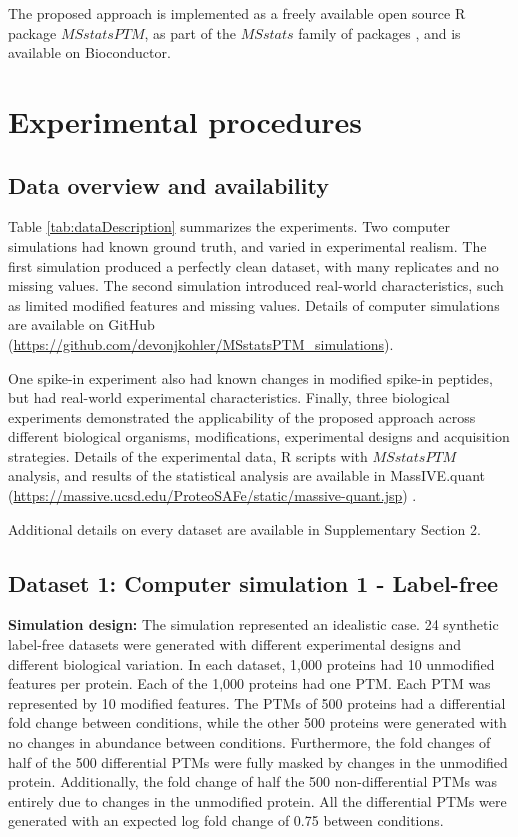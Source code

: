 \documentclass[mcp]{article}
\numberwithin{table}{section}
\begin{document}
The proposed approach is implemented as a freely available open source R package $MSstatsPTM$, as part of the $MSstats$ family of packages \cite{Choi:2014,Huang:2020}, and is available on Bioconductor.

\section{Experimental procedures}

\subsection*{Data overview and availability}

Table \ref{tab:dataDescription} summarizes the experiments. Two computer simulations had known ground truth, and varied in experimental realism. The first simulation produced a perfectly clean dataset, with many replicates and no missing values. The second simulation introduced real-world characteristics, such as limited modified features and missing values. Details of computer simulations are available on GitHub (\url{https://github.com/devonjkohler/MSstatsPTM_simulations}).

One spike-in experiment also had known changes in modified spike-in peptides, but had real-world experimental characteristics. Finally, three biological experiments demonstrated the applicability of the proposed approach across different biological organisms, modifications, experimental designs and acquisition strategies. Details of the experimental data, R scripts with $MSstatsPTM$ analysis, and results of the statistical analysis are available in MassIVE.quant (\url{https://massive.ucsd.edu/ProteoSAFe/static/massive-quant.jsp}) \cite{Choi:2020}. 

Additional details on every dataset are available in Supplementary Section 2.

\subsection*{Dataset 1: Computer simulation 1 - Label-free}
\label{sec:comp_sim_procedure1}

{\bf Simulation design:} The simulation represented an idealistic case. 24 synthetic label-free datasets were generated with different experimental designs and different biological variation. In each dataset, 1,000 proteins had 10 unmodified features per protein. Each of the 1,000 proteins had one PTM. Each PTM was represented by 10 modified features. The PTMs of 500 proteins had a differential fold change between conditions, while the other 500 proteins were generated with no changes in abundance between conditions. Furthermore, the fold changes of half of the 500 differential PTMs were fully masked by changes in the unmodified protein. Additionally, the fold change of half the 500 non-differential PTMs was entirely due to changes in the unmodified protein. All the differential PTMs were generated with an expected log fold change of 0.75 between conditions. 
\end{document}
